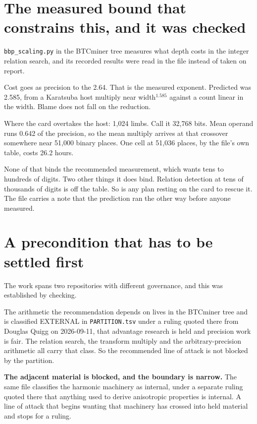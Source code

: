 \section{The measured bound that constrains this, and it was checked}

\texttt{bbp\_scaling.py} in the BTCminer tree measures what depth costs in the integer relation
search, and its recorded results were read in the file instead of taken on report.

Cost goes as precision to the 2.64. That is the measured exponent. Predicted was 2.585, from a
Karatsuba host multiply near width$^{1.585}$ against a count linear in the width. Blame does not
fall on the reduction.

Where the card overtakes the host: 1{,}024 limbs. Call it 32{,}768 bits. Mean operand runs 0.642 of
the precision, so the mean multiply arrives at that crossover somewhere near 51{,}000 binary places.
One cell at 51{,}036 places, by the file's own table, costs 26.2 hours.

None of that binds the recommended measurement, which wants tens to hundreds of digits. Two other
things it does bind. Relation detection at tens of thousands of digits is off the table. So is any
plan resting on the card to rescue it. The file carries a note that the prediction ran the other way
before anyone measured.

\section{A precondition that has to be settled first}

The work spans two repositories with different governance, and this was established by checking.

The arithmetic the recommendation depends on lives in the BTCminer tree and is classified EXTERNAL
in \texttt{PARTITION.\allowbreak{}tsv} under a ruling quoted there from Douglas Quigg on
2026-09-11, that advantage research is held and precision work is fair. The relation search, the
transform multiply and the arbitrary-precision arithmetic all carry that class. So the recommended
line of attack is not blocked by the partition.

\textbf{The adjacent material is blocked, and the boundary is narrow.} The same file classifies the
harmonic machinery as internal, under a separate ruling quoted there that anything used to derive
anisotropic properties is internal. A line of attack that begins wanting that machinery has crossed
into held material and stops for a ruling.

